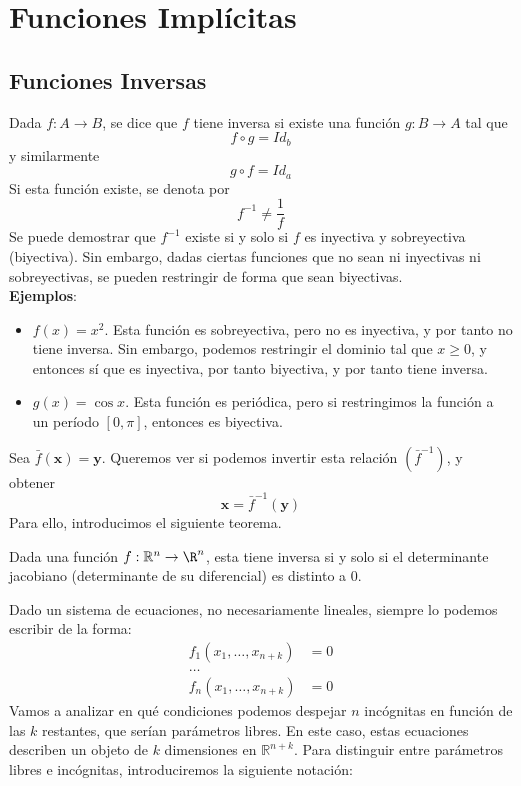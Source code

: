 \documentclass{../Calculo.tex}
\begin{document}
\chapter{Funciones Implícitas}
\section{Funciones Inversas}
Dada $f: A \to B$, se dice que $f$ tiene inversa si existe una función $g: B \to A$ tal que
\[
	f\circ g = Id_{b}
\]
y similarmente
\[
	g \circ f = Id_{a}
\]
Si esta función existe, se denota por
\[
	f^{-1} \neq \frac{1}{f}
\]
Se puede demostrar que $f^{-1}$ existe si y solo si $f$ es inyectiva y sobreyectiva (biyectiva). Sin embargo, dadas ciertas funciones que no sean ni inyectivas ni sobreyectivas, se pueden restringir de forma que sean biyectivas.\\
\textbf{Ejemplos}:
\begin{itemize}
	\item $f(x)=x ^{2}$. Esta función es sobreyectiva, pero no es inyectiva, y por tanto no tiene inversa. Sin embargo, podemos restringir el dominio tal que $x\geq 0$, y entonces sí que es inyectiva, por tanto biyectiva, y por tanto tiene inversa.
	\item $g(x)=\cos x$. Esta función es periódica, pero si restringimos la función a un período $[0, \pi]$, entonces es biyectiva.  
\end{itemize}
Sea $\bar{f}(\mathbf{x}) = \mathbf{y}$. Queremos ver si podemos invertir esta relación $(\bar{f}^{-1})$, y obtener
\[
	\mathbf{x} = \bar{f}^{-1}(\mathbf{y})
\]
Para ello, introducimos el siguiente teorema.
\begin{teorema}
	Dada una función $f:\mathbb{R}^{n} \to \R^{n}$, esta tiene inversa si y solo si el determinante jacobiano (determinante de su diferencial) es distinto a $0$.  
\end{teorema}
\pagebreak
	Dado un sistema de ecuaciones, no necesariamente lineales, siempre lo podemos escribir de la forma:
	\begin{equation}
		\begin{split}
			f_{1}(x_1,\dots ,x_{n+k})&=0\\
			\dots \\
			f_{n}(x_1,\dots ,x_{n+k})&=0
		\end{split}
	\end{equation}
	Vamos a analizar en qué condiciones podemos despejar $n$ incógnitas en función de las $k$ restantes, que serían parámetros libres. En este caso, estas ecuaciones describen un objeto de $k$ dimensiones en $\mathbb{R}^{n+k}$. Para distinguir entre parámetros libres e incógnitas, introduciremos la siguiente notación:
\end{document}
